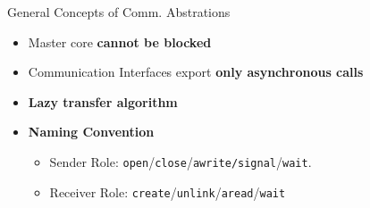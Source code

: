 		\begin{frame}[fragile]{General Concepts of Comm. Abstrations}
			\begin{itemize}
				\item Master core \textbf{cannot be blocked}
				\item Communication Interfaces export \textbf{only asynchronous calls}
				\item \textbf{Lazy transfer algorithm}
			\end{itemize}

			\begin{itemize}
				\item \textbf{Naming Convention}
				\begin{itemize}
					\item Sender Role: \texttt{open}/\texttt{close}/\texttt{awrite/signal}/\texttt{wait}.
					\item Receiver Role: \texttt{create}/\texttt{unlink}/\texttt{aread}/\texttt{wait}
				\end{itemize}
			\end{itemize}


		\end{frame}

